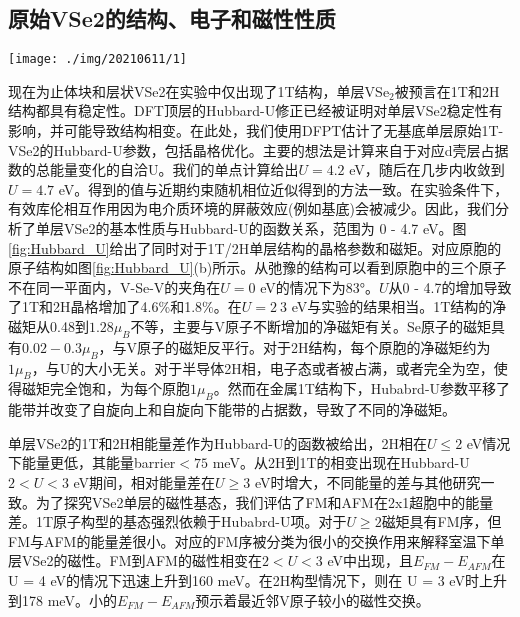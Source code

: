 \documentclass[reprint, aps, prb, showkeys]{revtex4-2}
\begin{document}
\subsection{原始VSe2的结构、电子和磁性性质}
\begin{figure*}[t]
    \texttt{[image: ./img/20210611/1]}
    \caption{\label{fig:Hubbard_U} 
    Structural parameters and magnetic moments for the 2H and 1T phases of VSe2 calculated as a function of the Hubbard U parameter
    }
\end{figure*}
现在为止体块和层状VSe2在实验中仅出现了1T结构，单层VSe$_2$被预言在1T和2H结构都具有稳定性。DFT顶层的Hubbard-U修正已经被证明对单层VSe2稳定性有影响，并可能导致结构相变。在此处，我们使用DFPT估计了无基底单层原始1T-VSe2的Hubbard-U参数，包括晶格优化。主要的想法是计算来自于对应d壳层占据数的总能量变化的自洽U。我们的单点计算给出$U = 4.2$ eV，随后在几步内收敛到$U = 4.7$ eV。得到的值与近期约束随机相位近似得到的方法一致。在实验条件下，有效库伦相互作用因为电介质环境的屏蔽效应(例如基底)会被减少。因此，我们分析了单层VSe2的基本性质与Hubbard-U的函数关系，范围为 0 - 4.7 eV。图\ref{fig:Hubbard_U}给出了同时对于1T/2H单层结构的晶格参数和磁矩。对应原胞的原子结构如图\ref{fig:Hubbard_U}(b)所示。从弛豫的结构可以看到原胞中的三个原子不在同一平面内，V-Se-V的夹角在$U = 0$ eV的情况下为83°。$U$从0 - 4.7的增加导致了1T和2H晶格增加了4.6\%和1.8\%。在$U = 2 ~ 3$ eV与实验的结果相当。1T结构的净磁矩从0.48到$1.28 \mu_B$不等，主要与V原子不断增加的净磁矩有关。Se原子的磁矩具有$0.02 - 0.3 \mu_B$，与V原子的磁矩反平行。对于2H结构，每个原胞的净磁矩约为$1 \mu_B$，与U的大小无关。对于半导体2H相，电子态或者被占满，或者完全为空，使得磁矩完全饱和，为每个原胞$1\mu_B$。然而在金属1T结构下，Hubabrd-U参数平移了能带并改变了自旋向上和自旋向下能带的占据数，导致了不同的净磁矩。

单层VSe2的1T和2H相能量差作为Hubbard-U的函数被给出，2H相在$U \le 2$ eV情况下能量更低，其能量barrier$<75$ meV。从2H到1T的相变出现在Hubbard-U $2 < U < 3$ eV期间，相对能量差在$U \ge 3$ eV时增大，不同能量的差与其他研究一致。为了探究VSe2单层的磁性基态，我们评估了FM和AFM在2x1超胞中的能量差。1T原子构型的基态强烈依赖于Hubabrd-U项。对于$U \ge 2$磁矩具有FM序，但FM与AFM的能量差很小。对应的FM序被分类为很小的交换作用来解释室温下单层VSe2的磁性。FM到AFM的磁性相变在$2 < U < 3$ eV中出现，且$E_{FM} - E_{AFM}$在U = 4 eV的情况下迅速上升到160 meV。在2H构型情况下，则在 U = 3 eV时上升到178 meV。小的$E_{FM} - E_{AFM}$预示着最近邻V原子较小的磁性交换。
\end{document}
